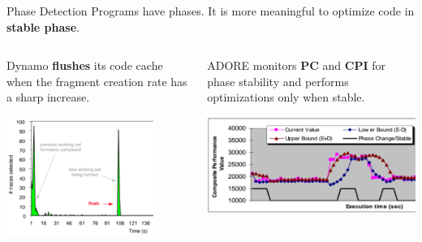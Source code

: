 \documentclass[aspectratio=169,xcolor=x11names]{beamer}
\begin{document}
	\begin{frame}{Phase Detection}
		Programs have phases. It is more meaningful to optimize code in \textbf{stable phase}.
		\begin{block}{}
			\begin{columns}
				\begin{column}[T]{0.46\linewidth}
					\alert{Dynamo} \textbf{flushes} its code cache when the fragment creation rate has a sharp increase.
					\begin{center}
						\includegraphics[width=0.8\textwidth]{Dynamo-flush}
					\end{center}
				\end{column}
				\begin{column}[T]{0.46\linewidth}
					\alert{ADORE} monitors \textbf{PC} and \textbf{CPI} for phase stability and performs optimizations only when stable.
					\begin{center}
						\includegraphics[width=\textwidth]{ADORE-phase}
					\end{center}
				\end{column}
			\end{columns}
		\end{block}
	\end{frame}
	
\end{document}
